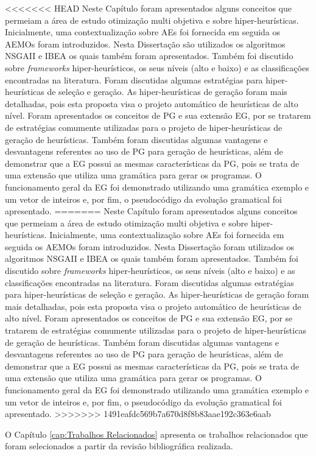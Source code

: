 <<<<<<< HEAD
Neste Capítulo foram apresentados alguns conceitos que permeiam a área de estudo otimização multi objetiva e sobre hiper-heurísticas. Inicialmente, uma contextualização sobre AEs foi fornecida em seguida os AEMOs foram introduzidos. Nesta Dissertação são utilizados os algoritmos NSGAII e IBEA os quais também foram apresentados. Também foi discutido sobre \textit{frameworks} hiper-heurísticos,  os seus níveis (alto e baixo) e as classificações encontradas na literatura.  Foram discutidas algumas estratégias para hiper-heurísticas de seleção e geração. As hiper-heurísticas de geração foram mais detalhadas, pois esta proposta visa o projeto  automático de heurísticas de alto nível. Foram apresentados os conceitos de PG e sua extensão EG, por se tratarem de estratégias comumente utilizadas para o projeto de hiper-heurísticas de geração de heurísticas. Também foram discutidas algumas vantagens e desvantagens referentes ao uso de PG para geração de heurísticas, além de demonstrar que a EG possui as mesmas características da PG, pois se trata de uma extensão que utiliza uma gramática para gerar os programas. O funcionamento geral da EG foi demonstrado utilizando uma gramática exemplo e um vetor de inteiros e, por fim, o pseudocódigo da evolução gramatical foi apresentado. 
=======
Neste Capítulo foram apresentados alguns conceitos que permeiam a área de estudo otimização multi objetiva e sobre hiper-heurísticas. Inicialmente, uma contextualização sobre AEs foi fornecida em seguida os AEMOs foram introduzidos. Nesta Dissertação foram utilizados os algoritmos NSGAII e IBEA os quais também foram apresentados. Também foi discutido sobre \textit{frameworks} hiper-heurísticos,  os seus níveis (alto e baixo) e as classificações encontradas na literatura.  Foram discutidas algumas estratégias para hiper-heurísticas de seleção e geração. As hiper-heurísticas de geração foram mais detalhadas, pois esta proposta visa o projeto  automático de heurísticas de alto nível. Foram apresentados os conceitos de PG e sua extensão EG, por se tratarem de estratégias comumente utilizadas para o projeto de hiper-heurísticas de geração de heurísticas. Também foram discutidas algumas vantagens e desvantagens referentes ao uso de PG para geração de heurísticas, além de demonstrar que a EG possui as mesmas características da PG, pois se trata de uma extensão que utiliza uma gramática para gerar os programas. O funcionamento geral da EG foi demonstrado utilizando uma gramática exemplo e um vetor de inteiros e, por fim, o pseudocódigo da evolução gramatical foi apresentado. 
>>>>>>> 1491eafdc569b7a670d8f8b83aae192c363e6aab

O Capítulo \ref{cap:Trabalhos Relacionados} apresenta os trabalhos relacionados que foram selecionados a partir da revisão bibliográfica realizada.



